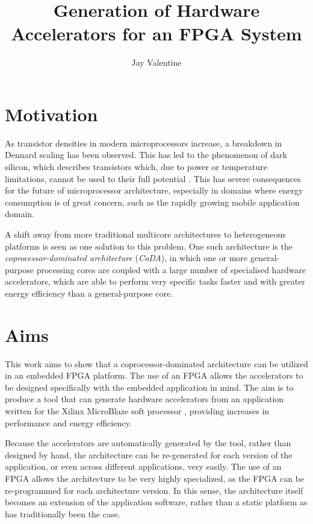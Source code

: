 \documentclass{UoYCSproject}
\begin{document}
\title{Generation of Hardware Accelerators for an FPGA System}
\author{Jay Valentine}

\maketitle

\begin{summary}

\section{Motivation}

As transistor densities in modern microprocessors increase, a breakdown in Dennard scaling \cite{dennard} has been
observed. This has led to the phenomenon of dark silicon, which describes transistors which, due to power or temperature
limitations, cannot be used to their full potential \cite{darksilicon}. This has severe consequences for the future of
microprocessor architecture, especially in domains where energy consumption is of great concern, such as the rapidly growing
mobile application domain.

A shift away from more traditional multicore architectures to heterogeneous platforms is seen as one solution to this problem.
One such architecture is the \textit{coprocessor-dominated architecture} (\textit{CoDA}), in which one or more general-purpose
processing cores are coupled with a large number of specialised hardware accelerators, which are able to perform very specific
tasks faster and with greater energy efficiency than a general-purpose core.

\section{Aims}

This work aims to show that a coprocessor-dominated architecture can be utilized in an embedded FPGA platform.
The use of an FPGA allows the accelerators to be designed specifically with the embedded application in mind.
The aim is to produce a tool that can generate hardware accelerators from an application written for the Xilinx MicroBlaze
soft processor \cite{microblaze}, providing increases in performance and energy efficiency.

Because the accelerators are automatically generated by the tool, rather than designed by hand, the architecture
can be re-generated for each version of the application, or even across different applications, very easily.
The use of an FPGA allows the architecture to be very highly specialized, as the FPGA can be re-programmed for each architecture
version. In this sense, the architecture itself becomes an extension of the application software, rather than a static
platform as has traditionally been the case.


\end{summary}
\end{document}
